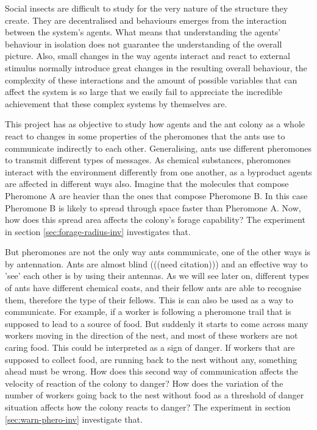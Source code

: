 Social insects are difficult to study for the very nature of the structure they create. They are decentralised and behaviours emerges from the interaction between the system's agents. What means that understanding the agents' behaviour in isolation does not guarantee the understanding of the overall picture. Also, small changes in the way agents interact and react to external stimulus normally introduce great changes in the resulting overall behaviour, the complexity of these interactions and the amount of possible variables that can affect the system is so large that we easily fail to appreciate the incredible achievement that these complex systems by themselves are.

This project has as objective to study how agents and the ant colony as a whole react to changes in some properties of the pheromones that the ants use to communicate indirectly to each other. Generalising, ants use different pheromones to transmit different types of messages. As chemical substances, pheromones interact with the environment differently from one another, as a byproduct agents are affected in different ways also. Imagine that the molecules that compose Pheromone A are heavier than the ones that compose Pheromone B. In this case Pheromone B is likely to spread through space faster than Pheromone A. Now, how does this spread area affects the colony's forage capability? The experiment in section \ref{sec:forage-radius-inv} investigates that. 

But pheromones are not the only way ants communicate, one of the other ways is by antennation. Ants are almost blind (((need citation))) and an effective way to 'see' each other is by using their antennas. As we will see later on, different types of ants have different chemical coats, and their fellow ants are able to recognise them, therefore the type of their fellows. This is can also be used as a way to communicate. For example, if a worker is following a pheromone trail that is supposed to lead to a source of food. But suddenly it starts to come across many workers moving in the direction of the nest, and most of these workers are not caring food. This could be interpreted as a sign of danger. If workers that are supposed to collect food, are running back to the nest without any, something ahead must be wrong. How does this second way of communication affects the velocity of reaction of the colony to danger? How does the variation of the number of workers going back to the nest without food as a threshold of danger situation affects how the colony reacts to danger? The experiment in section \ref{sec:warn-phero-inv} investigate that. 

